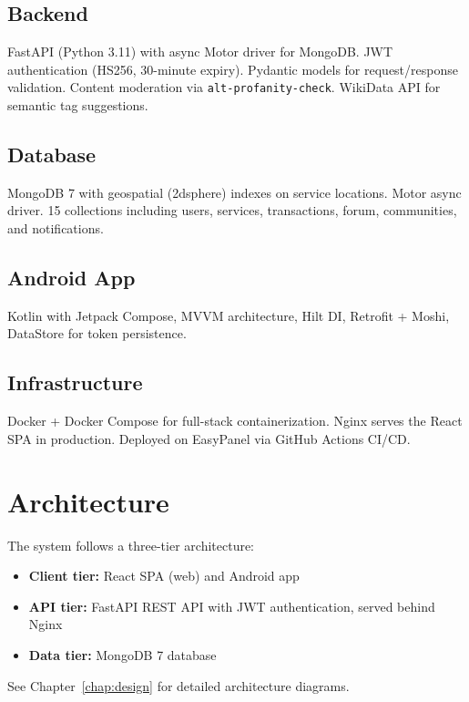 \documentclass[11pt,a4paper]{report}
\begin{document}
\subsection{Backend}

FastAPI (Python 3.11) with async Motor driver for MongoDB. JWT authentication (HS256, 30-minute expiry). Pydantic models for request/response validation. Content moderation via \texttt{alt-profanity-check}. WikiData API for semantic tag suggestions.

\subsection{Database}

MongoDB 7 with geospatial (2dsphere) indexes on service locations. Motor async driver. 15 collections including users, services, transactions, forum, communities, and notifications.

\subsection{Android App}

Kotlin with Jetpack Compose, MVVM architecture, Hilt DI, Retrofit + Moshi, DataStore for token persistence.

\subsection{Infrastructure}

Docker + Docker Compose for full-stack containerization. Nginx serves the React SPA in production. Deployed on EasyPanel via GitHub Actions CI/CD.

\section{Architecture}

The system follows a three-tier architecture:
\begin{itemize}
    \item \textbf{Client tier:} React SPA (web) and Android app
    \item \textbf{API tier:} FastAPI REST API with JWT authentication, served behind Nginx
    \item \textbf{Data tier:} MongoDB 7 database
\end{itemize}

See Chapter~\ref{chap:design} for detailed architecture diagrams.
\end{document}
